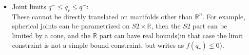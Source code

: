 \begin{itemize}
\item Joint limits ${q^-} \leq q_r \leq {q^+}$:\\
These cannot be directly translated on manifolds other than $\mathbb{R}^n$.
For example, spherical joints can be parametrized on $S2 \times \mathbb{R}$, then the $S2$ part can be limited by a cone, and the $\mathbb{R}$ part can have real bounds(in that case the limit constraint is not a simple bound constraint, but writes as $f(q_r)\leq 0$).


\end{itemize}
